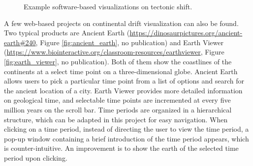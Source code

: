 \documentclass[11pt, a4paper,oneside,chapterprefix=false]{scrbook}
\begin{document}
\newpage
\begin{figure}[h]
	\centering
	\hfill
	\caption{Example software-based visualizations on tectonic shift. }
	\label{fig:software_tectonic}
\end{figure}

A few web-based projects on continental drift visualization can also be found. Two typical products are Ancient Earth (\url{https://dinosaurpictures.org/ancient-earth#240}, Figure \ref{fig:ancient_earth}, no publication) and Earth Viewer (\url{https://www.biointeractive.org/classroom-resources/earthviewer}, Figure \ref{fig:earth_viewer}, no publication). Both of them show the coastlines of the continents at a select time point on a three-dimensional globe. Ancient Earth allows users to pick a particular time point from a list of options and search for the ancient location of a city. Earth Viewer provides more detailed information on geological time, and selectable time points are incremented at every five million years on the scroll bar. Time periods are organized in a hierarchical structure, which can be adapted in this project for easy navigation. When clicking on a time period, instead of directing the user to view the time period, a pop-up window containing a brief introduction of the time period appears, which is counter-intuitive. An improvement is to show the earth of the selected time period upon clicking. \\
\end{document}
